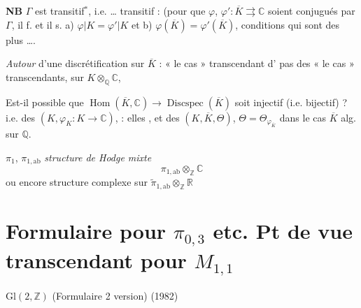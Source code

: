 \documentclass[11pt,a4paper]{article}
\begin{document}
\textbf{NB} \struck{\ill{}} $\Gamma$ est transitif$^{*}$, i.e.  … \ill{} transitif : \struck{\ill{}} \add{$\varphi$ \ill{}} (pour que $\varphi$, $\varphi' : \overline{K} \rightrightarrows \mathbb{C}$ soient conjugués par $\Gamma$, il f. et il s. a) $\varphi|K = \varphi'|K$ et b) $\varphi(\overline{K}) = \varphi'(\overline{K})$, conditions qui sont des plus  ….


\emph{Autour} d'une discrétification sur $\overline{K}$ : \ill{} \ill{} \ill{} « le cas » transcendant d' pas \struck{\ill{}} des \struck{\ill{}} « le cas » transcendants, sur $K \otimes_{\mathbb{Q}} \mathbb{C}$, \ill{}

Est-il possible que $\operatorname{Hom}(\overline{K},\mathbb{C}) \to \operatorname{Discspec}(\overline{K})$ soit injectif (i.e. bijectif) ?  \struck{\ill{}} \ill{} i.e. des $(K, \varphi_K : K \to \mathbb{C})$, \emph{} : elles \ill{} \emph{}, et \ill{} des $(K,\overline{K},\Theta)$, $\Theta = \Theta_{\varphi_{\overline{K}}}$  dans le cas  $\overline{K}$ alg. sur $\mathbb{Q}$.

$\pi_1$, $\pi_{1,\mathrm{ab}}$ \emph{structure de Hodge mixte}
\[
\pi_{1,\mathrm{ab}} \otimes_{\mathbb{Z}} \mathbb{C}
\]
ou encore structure complexe sur $\widetilde{\pi}_{1,\mathrm{ab}} \otimes_{\mathbb{Z}} \mathbb{R}$

\section{Formulaire pour $\pi_{0,3}$ etc. Pt de vue transcendant pour $M_{1,1}$}

\emph{$\mathrm{Gl}(2,\mathbb{Z})$} (Formulaire 2 version) (1982)
\end{document}
